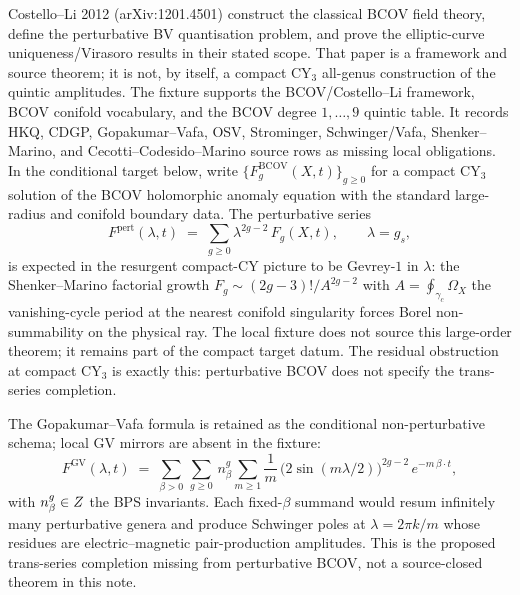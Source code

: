 \documentclass[12pt]{amsart}
\theoremstyle{remark}
\begin{document}
Costello--Li 2012 (arXiv:1201.4501) construct the classical BCOV field
theory, define the perturbative BV quantisation problem, and prove the
elliptic-curve uniqueness/Virasoro results in their stated scope. That
paper is a framework and source theorem; it is not, by itself, a compact
CY$_3$ all-genus construction of the quintic amplitudes. The fixture
supports the BCOV/Costello--Li framework, BCOV conifold vocabulary, and
the BCOV degree \(1,\dots,9\) quintic table. It records HKQ, CDGP,
Gopakumar--Vafa, OSV, Strominger, Schwinger/Vafa, Shenker--Marino, and
Cecotti--Codesido--Marino source rows as missing local obligations. In
the conditional target below, write
$\{F_g^{\mathrm{BCOV}}(X,t)\}_{g\geq0}$ for a compact CY$_3$ solution of
the BCOV holomorphic anomaly equation with the standard large-radius and
conifold boundary data. The
perturbative series
\[
  F^{\mathrm{pert}}(\lambda, t) \;=\; \sum_{g \geq 0} \lambda^{2g - 2}\, F_g(X, t),
  \qquad \lambda = g_s,
\]
is expected in the resurgent compact-CY picture to be Gevrey-$1$ in
\(\lambda\): the Shenker--Marino factorial growth
$F_g \sim (2g - 3)! / A^{2g - 2}$ with $A = \oint_{\gamma_c} \Omega_X$
the vanishing-cycle period at the nearest conifold singularity forces
Borel non-summability on the physical ray. The local fixture does not
source this large-order theorem; it remains part of the compact target
datum. The residual obstruction at compact CY$_3$ is exactly this:
perturbative BCOV does not specify the trans-series completion.

The Gopakumar--Vafa formula is retained as the conditional
non-perturbative schema; local GV mirrors are absent in the fixture:
\begin{equation}\label{eq:gv-expansion}
  F^{\mathrm{GV}}(\lambda, t) \;=\; \sum_{\beta > 0}\, \sum_{g \geq 0}\, n_\beta^g
    \sum_{m \geq 1} \frac{1}{m}\,
    \bigl(2 \sin(m \lambda / 2)\bigr)^{2g - 2}\,
    e^{- m\, \beta \cdot t},
\end{equation}
with $n_\beta^g \in Z$ the BPS invariants. Each fixed-$\beta$ summand
would resum infinitely many perturbative genera and produce Schwinger
poles at $\lambda = 2\pi k / m$ whose residues are electric--magnetic
pair-production amplitudes. This is the proposed trans-series completion
missing from perturbative BCOV, not a source-closed theorem in this note.
\end{document}
